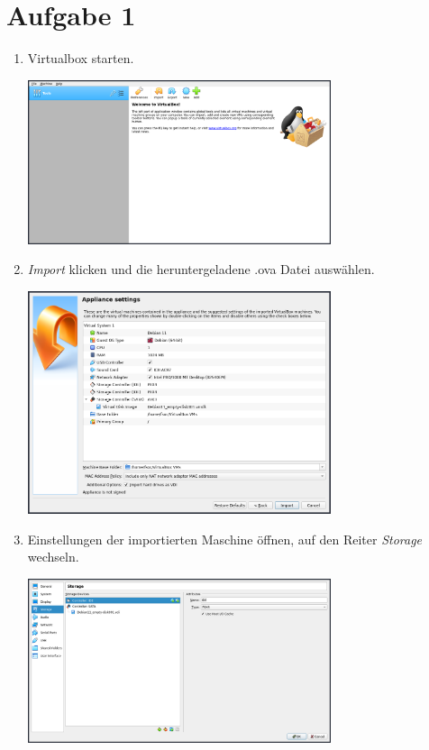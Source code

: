 \documentclass{article}
\begin{document}
\section*{Aufgabe 1}

\begin{enumerate}
    \item Virtualbox starten.
    \begin{center}
        \includegraphics[width=0.7\textwidth]{01.png}
    \end{center}

    \item \emph{Import} klicken und die heruntergeladene .ova Datei auswählen.
    \begin{center}
        \includegraphics[width=0.7\textwidth]{02.png}
    \end{center}

    \item Einstellungen der importierten Maschine öffnen, auf den Reiter \emph{Storage} wechseln.
    \begin{center}
        \includegraphics[width=0.7\textwidth]{05.png}
    \end{center}


\end{enumerate}
\end{document}
